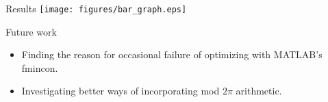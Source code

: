 \documentclass[final]{beamer}
\begin{document}
\begin{frame}{}
{\begin{columns}[t]
\begin{column}{.30\linewidth}
\begin{block}{\centering Results}
\centering\texttt{[image: figures/bar\_graph.eps]}

\end{block}



                
                
\begin{block}{\centering Future work}
\begin{itemize}
	\item Finding the reason for occasional failure of optimizing with MATLAB's fmincon.
	\item Investigating better ways of incorporating mod $2\pi$ arithmetic.
\end{itemize}
\end{block}
                
                

%                       
                

                    
                       
                    
                

\end{column}
\end{columns}}
\end{frame}
\end{document}
